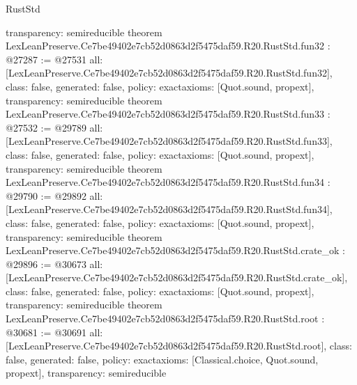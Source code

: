 \begin{lexlean}{RustStd}
\begin{coremodule}
{  transparency: semireducible
}
theorem LexLeanPreserve.Ce7be49402e7cb52d0863d2f5475daf59.R20.RustStd.fun32 : @27287 := @27531 {
  all: [LexLeanPreserve.Ce7be49402e7cb52d0863d2f5475daf59.R20.RustStd.fun32],
  class: false,
  generated: false,
  policy: exact{axioms: [Quot.sound, propext]},
  transparency: semireducible
}
theorem LexLeanPreserve.Ce7be49402e7cb52d0863d2f5475daf59.R20.RustStd.fun33 : @27532 := @29789 {
  all: [LexLeanPreserve.Ce7be49402e7cb52d0863d2f5475daf59.R20.RustStd.fun33],
  class: false,
  generated: false,
  policy: exact{axioms: [Quot.sound, propext]},
  transparency: semireducible
}
theorem LexLeanPreserve.Ce7be49402e7cb52d0863d2f5475daf59.R20.RustStd.fun34 : @29790 := @29892 {
  all: [LexLeanPreserve.Ce7be49402e7cb52d0863d2f5475daf59.R20.RustStd.fun34],
  class: false,
  generated: false,
  policy: exact{axioms: [Quot.sound, propext]},
  transparency: semireducible
}
theorem LexLeanPreserve.Ce7be49402e7cb52d0863d2f5475daf59.R20.RustStd.crate_ok : @29896 := @30673 {
  all: [LexLeanPreserve.Ce7be49402e7cb52d0863d2f5475daf59.R20.RustStd.crate_ok],
  class: false,
  generated: false,
  policy: exact{axioms: [Quot.sound, propext]},
  transparency: semireducible
}
theorem LexLeanPreserve.Ce7be49402e7cb52d0863d2f5475daf59.R20.RustStd.root : @30681 := @30691 {
  all: [LexLeanPreserve.Ce7be49402e7cb52d0863d2f5475daf59.R20.RustStd.root],
  class: false,
  generated: false,
  policy: exact{axioms: [Classical.choice, Quot.sound, propext]},
  transparency: semireducible
}


\end{coremodule}
\end{lexlean}
